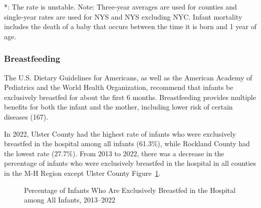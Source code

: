 \documentclass[
  english,
  letterpaper,
]{report}
\begin{document}
\begin{tcolorbox}[enhanced jigsaw, breakable, leftrule=.75mm, title=\textcolor{quarto-callout-note-color}{\faInfo}\hspace{0.5em}{Note}, bottomrule=.15mm, opacityback=0, left=2mm, colback=white, bottomtitle=1mm, coltitle=black, colbacktitle=quarto-callout-note-color!10!white, colframe=quarto-callout-note-color-frame, opacitybacktitle=0.6, toptitle=1mm, titlerule=0mm, arc=.35mm, rightrule=.15mm, toprule=.15mm]

*: The rate is unstable. Note: Three-year averages are used for counties
and single-year rates are used for NYS and NYS excluding NYC. Infant
mortality includes the death of a baby that occurs between the time it
is born and 1 year of age.

\end{tcolorbox}

\subsubsection{Breastfeeding}\label{breastfeeding}

The U.S. Dietary Guidelines for Americans, as well as the American
Academy of Pediatrics and the World Health Organization, recommend that
infants be exclusively breastfed for about the first 6 months.
Breastfeeding provides multiple benefits for both the infant and the
mother, including lower risk of certain diseases (167).

In 2022, Ulster County had the highest rate of infants who were
exclusively breastfed in the hospital among all infants (61.3\%), while
Rockland County had the lowest rate (27.7\%). From 2013 to 2022, there
was a decrease in the percentage of infants who were exclusively
breastfed in the hospital in all counties in the M-H Region except
Ulster County Figure~\ref{fig-hospital-exclusive-bf-percent}.

\begin{figure}


\caption{\label{fig-hospital-exclusive-bf-percent}Percentage of Infants
Who Are Exclusively Breastfed in the Hospital among All Infants,
2013--2022}

\end{figure}%
\end{document}
